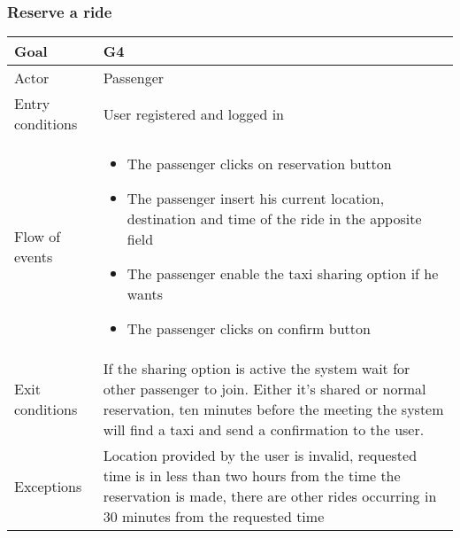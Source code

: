 \subsubsection{Reserve a ride}
\begin {tabular} {|p{3cm}|p{10cm}|}
\hline
Goal & G4\\
\hline
Actor & Passenger\\
\hline
Entry conditions & User registered and logged in\\
\hline
Flow of events &
\begin {itemize}
\item The passenger clicks on reservation button
\item The passenger insert his current location, destination and time of the ride in the apposite field
\item The passenger enable the taxi sharing option if he wants
\item The passenger clicks on confirm button
\end {itemize}\\
\hline
Exit conditions & If the sharing option is active the system wait for other passenger to join.
Either it's shared or normal reservation, ten minutes before the meeting the system will find a taxi and send a confirmation to the user.\\
\hline
Exceptions & Location provided by the user is invalid, requested time is in less than two hours from the time the reservation is made, there are other rides occurring in 30 minutes from the requested time\\
\hline
\end {tabular}
\begin{figure}[h!]
	\centering
\end{figure}
\newpage

